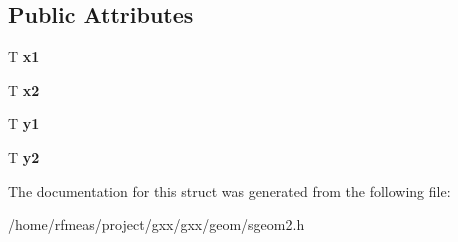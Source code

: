 \subsection*{Public Attributes}
\begin{DoxyCompactItemize}
\item 
T {\bfseries x1}\hypertarget{structgxx_1_1sgeom2_1_1line_a4569a4ebf6a9b0f8c05cf80dfa6651f8}{}\label{structgxx_1_1sgeom2_1_1line_a4569a4ebf6a9b0f8c05cf80dfa6651f8}

\item 
T {\bfseries x2}\hypertarget{structgxx_1_1sgeom2_1_1line_a161e3ee318ae934d8dd6a4e080f074bd}{}\label{structgxx_1_1sgeom2_1_1line_a161e3ee318ae934d8dd6a4e080f074bd}

\item 
T {\bfseries y1}\hypertarget{structgxx_1_1sgeom2_1_1line_ac732fc6289fefd03983304e077d7bc28}{}\label{structgxx_1_1sgeom2_1_1line_ac732fc6289fefd03983304e077d7bc28}

\item 
T {\bfseries y2}\hypertarget{structgxx_1_1sgeom2_1_1line_ad16c60a81b9246f41c9d1cf87f4f7eb1}{}\label{structgxx_1_1sgeom2_1_1line_ad16c60a81b9246f41c9d1cf87f4f7eb1}

\end{DoxyCompactItemize}


The documentation for this struct was generated from the following file\+:\begin{DoxyCompactItemize}
\item 
/home/rfmeas/project/gxx/gxx/geom/sgeom2.\+h\end{DoxyCompactItemize}
